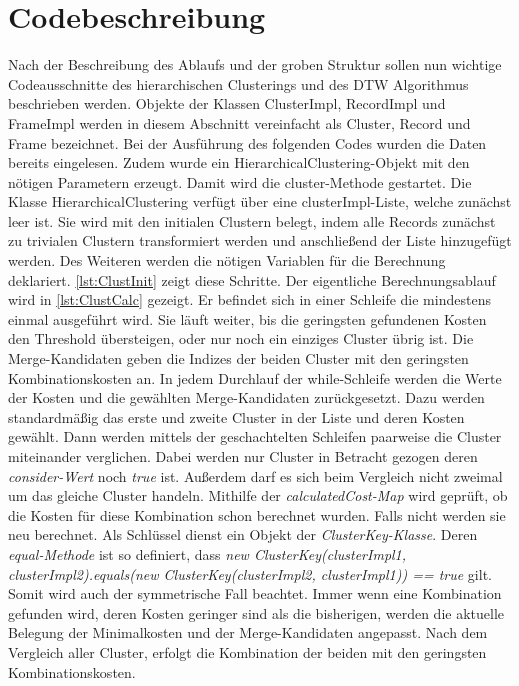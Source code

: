 \section{Codebeschreibung}
\label{5-Codebeschreibung}
Nach der Beschreibung des Ablaufs und der groben Struktur
sollen nun wichtige Codeausschnitte des hierarchischen Clusterings
und des \ac{DTW} Algorithmus beschrieben werden.
Objekte der Klassen ClusterImpl, RecordImpl und FrameImpl werden in diesem Abschnitt
vereinfacht als Cluster, Record und Frame bezeichnet.
Bei der Ausführung des folgenden Codes wurden die Daten bereits eingelesen.
Zudem wurde ein HierarchicalClustering-Objekt mit den nötigen Parametern erzeugt.
Damit wird die cluster-Methode gestartet.
Die Klasse HierarchicalClustering verfügt über eine clusterImpl-Liste,
welche zunächst leer ist.
Sie wird mit den initialen Clustern belegt,
indem alle Records zunächst zu trivialen Clustern transformiert werden
und anschließend der Liste hinzugefügt werden.
Des Weiteren werden die nötigen Variablen für die Berechnung deklariert.
\autoref{lst:ClustInit} zeigt diese Schritte.
Der eigentliche Berechnungsablauf wird in \autoref{lst:ClustCalc} gezeigt.
Er befindet sich in einer Schleife die mindestens einmal ausgeführt wird.
Sie läuft weiter, bis die geringsten gefundenen Kosten den Threshold übersteigen,
oder nur noch ein einziges Cluster übrig ist.
Die Merge-Kandidaten geben die Indizes der beiden Cluster mit den
geringsten Kombinationskosten an.
In jedem Durchlauf der while-Schleife werden die Werte der Kosten
und die gewählten Merge-Kandidaten zurückgesetzt.
Dazu werden standardmäßig das erste und zweite Cluster in der Liste und deren Kosten gewählt.
Dann werden mittels der geschachtelten Schleifen paarweise die Cluster miteinander verglichen.
Dabei werden nur Cluster in Betracht gezogen deren \emph{consider-Wert} noch \emph{true} ist.
Außerdem darf es sich beim Vergleich nicht zweimal um das gleiche Cluster handeln.
Mithilfe der \emph{calculatedCost-Map} wird geprüft, ob die Kosten für diese Kombination schon berechnet wurden.
Falls nicht werden sie neu berechnet.
Als Schlüssel dienst ein Objekt der \emph{ClusterKey-Klasse}.
Deren \emph{equal-Methode} ist so definiert,
dass \emph{new ClusterKey(clusterImpl1, clusterImpl2).equals(new ClusterKey(clusterImpl2, clusterImpl1)) == true} gilt.
Somit wird auch der symmetrische Fall beachtet.
Immer wenn eine Kombination gefunden wird, deren Kosten geringer sind als die bisherigen,
werden die aktuelle Belegung der Minimalkosten und der Merge-Kandidaten angepasst.
Nach dem Vergleich aller Cluster, erfolgt die Kombination der beiden mit den geringsten Kombinationskosten.
